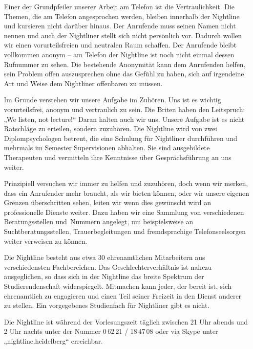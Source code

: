 Einer der Grundpfeiler unserer Arbeit am Telefon ist die Vertraulichkeit. Die 
Themen, die am Telefon angesprochen werden, bleiben innerhalb der Nightline und 
kursieren nicht darüber hinaus. Der Anrufende muss seinen Namen nicht nennen und 
auch der Nightliner stellt sich nicht persönlich vor. Dadurch wollen wir einen 
vorurteilsfreien und neutralen Raum schaffen. Der Anrufende bleibt vollkommen anonym 
– am Telefon der Nightline ist noch nicht einmal dessen Rufnummer zu sehen. Die 
bestehende Anonymität kann dem Anrufenden helfen, sein Problem offen auszusprechen 
ohne das Gefühl zu haben, sich auf irgendeine Art und Weise dem Nightliner 
offenbaren zu müssen.

Im Grunde verstehen wir unsere Aufgabe im Zuhören. Uns ist es wichtig 
vorurteilsfrei, anonym und vertraulich zu sein. Die Briten haben den Leitspruch: „We 
listen, not lecture!“ Daran halten auch wir uns. Unsere Aufgabe ist es nicht 
Ratschläge zu erteilen, sondern zuzuhören. Die Nightline wird von zwei 
Diplompsychologen betreut, die eine Schulung für Nightliner durchführen und mehrmals 
im Semester Supervisionen abhalten. Sie sind ausgebildete Therapeuten und vermitteln 
ihre Kenntnisse über Gesprächsführung an uns weiter.

Prinzipiell versuchen wir immer zu helfen und zuzuhören, doch wenn wir merken, dass 
ein Anrufender mehr braucht, als wir bieten können, oder wir unsere eigenen Grenzen 
überschritten sehen, leiten wir wenn dies gewünscht wird an professionelle Dienste 
weiter. Dazu haben wir eine Sammlung von verschiedenen Beratungsstellen und~Nummern 
angelegt, um beispielsweise an Suchtberatungsstellen, Trauerbegleitungen und 
fremdsprachige Telefonseelsorgen weiter verweisen zu können.

Die Nightline besteht aus etwa 30 ehrenamtlichen Mitarbeitern aus verschiedensten 
Fachbereichen. Das Geschlechterverhältnis ist nahezu ausgeglichen, so dass sich in 
der Nightline das breite Spektrum der Studierendenschaft widerspiegelt. Mitmachen kann 
jeder, der bereit ist, sich ehrenamtlich zu engagieren und einen Teil seiner 
Freizeit in den Dienst anderer zu stellen. Ein vorgegebenes Studienfach für 
Nightliner gibt es nicht.

Die Nightline ist während 
der Vorlesungszeit täglich zwischen 21 Uhr abends und 2 Uhr nachts unter der Nummer 
0\,62\,21 / 18\,47\,08 oder via Skype unter „nightline.heidelberg“ erreichbar.
